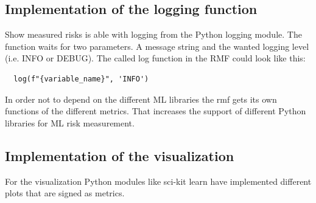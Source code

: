 \subsection{Implementation of the logging function}

Show measured risks is able with logging from the Python logging module. The function waits for two parameters. A message string and the wanted logging level (i.e. INFO or DEBUG). The called log function in the RMF could look like this:
\begin{lstlisting}
  log(f"{variable_name}", 'INFO')
\end{lstlisting}

In order not to depend on the different ML libraries the rmf gets its own functions of the different metrics. That increases the support of different Python libraries for ML risk
measurement.

\subsection{Implementation of the visualization}

For the visualization Python modules like sci-kit learn have implemented different plots that are signed as metrics.
